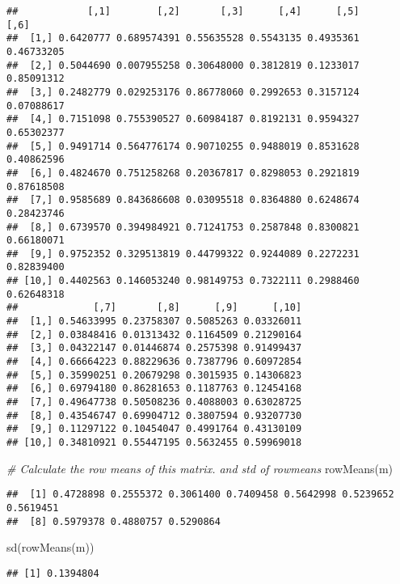 \documentclass[
]{article}
\newenvironment{Shaded}{\begin{snugshade}}{\end{snugshade}}
\newcommand{\CommentTok}[1]{\textcolor[rgb]{0.56,0.35,0.01}{\textit{#1}}}
\newcommand{\FunctionTok}[1]{\textcolor[rgb]{0.00,0.00,0.00}{#1}}
\newcommand{\NormalTok}[1]{#1}
\begin{document}
\begin{verbatim}
##            [,1]        [,2]       [,3]      [,4]      [,5]       [,6]
##  [1,] 0.6420777 0.689574391 0.55635528 0.5543135 0.4935361 0.46733205
##  [2,] 0.5044690 0.007955258 0.30648000 0.3812819 0.1233017 0.85091312
##  [3,] 0.2482779 0.029253176 0.86778060 0.2992653 0.3157124 0.07088617
##  [4,] 0.7151098 0.755390527 0.60984187 0.8192131 0.9594327 0.65302377
##  [5,] 0.9491714 0.564776174 0.90710255 0.9488019 0.8531628 0.40862596
##  [6,] 0.4824670 0.751258268 0.20367817 0.8298053 0.2921819 0.87618508
##  [7,] 0.9585689 0.843686608 0.03095518 0.8364880 0.6248674 0.28423746
##  [8,] 0.6739570 0.394984921 0.71241753 0.2587848 0.8300821 0.66180071
##  [9,] 0.9752352 0.329513819 0.44799322 0.9244089 0.2272231 0.82839400
## [10,] 0.4402563 0.146053240 0.98149753 0.7322111 0.2988460 0.62648318
##             [,7]       [,8]      [,9]      [,10]
##  [1,] 0.54633995 0.23758307 0.5085263 0.03326011
##  [2,] 0.03848416 0.01313432 0.1164509 0.21290164
##  [3,] 0.04322147 0.01446874 0.2575398 0.91499437
##  [4,] 0.66664223 0.88229636 0.7387796 0.60972854
##  [5,] 0.35990251 0.20679298 0.3015935 0.14306823
##  [6,] 0.69794180 0.86281653 0.1187763 0.12454168
##  [7,] 0.49647738 0.50508236 0.4088003 0.63028725
##  [8,] 0.43546747 0.69904712 0.3807594 0.93207730
##  [9,] 0.11297122 0.10454047 0.4991764 0.43130109
## [10,] 0.34810921 0.55447195 0.5632455 0.59969018
\end{verbatim}

\begin{Shaded}
\begin{Highlighting}[]
\CommentTok{\# Calculate the row means  of this matrix. and std of rowmeans }
\FunctionTok{rowMeans}\NormalTok{(m)}
\end{Highlighting}
\end{Shaded}

\begin{verbatim}
##  [1] 0.4728898 0.2555372 0.3061400 0.7409458 0.5642998 0.5239652 0.5619451
##  [8] 0.5979378 0.4880757 0.5290864
\end{verbatim}

\begin{Shaded}
\begin{Highlighting}[]
\FunctionTok{sd}\NormalTok{(}\FunctionTok{rowMeans}\NormalTok{(m))}
\end{Highlighting}
\end{Shaded}

\begin{verbatim}
## [1] 0.1394804
\end{verbatim}
\end{document}
